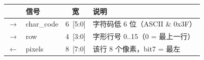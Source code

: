 \begin{tabular}{@{}c l c p{3.9cm}@{}}
\toprule
\textbf{} & \textbf{信号} & \textbf{宽} & \textbf{说明}\\
\midrule
$\rightarrow$ & {\ttfamily char\_code} & 6{\scriptsize\ttfamily\ {[}5:0{]}} & 字符码低 6 位（ASCII \& 0x3F） \\
$\rightarrow$ & {\ttfamily row} & 4{\scriptsize\ttfamily\ {[}3:0{]}} & 字形行号 0..15（0 = 最上一行） \\
$\leftarrow$ & {\ttfamily pixels} & 8{\scriptsize\ttfamily\ {[}7:0{]}} & 该行 8 个像素，bit7 = 最左 \\
\bottomrule
\end{tabular}
